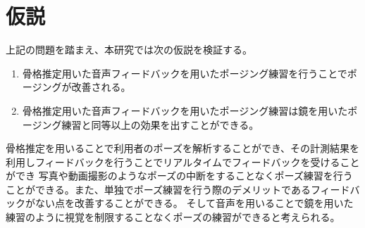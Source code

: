 \section{仮説}
上記の問題を踏まえ、本研究では次の仮説を検証する。
\begin{enumerate}
  \item 骨格推定用いた音声フィードバックを用いたポージング練習を行うことでポージングが改善される。
  \item 骨格推定用いた音声フィードバックを用いたポージング練習は鏡を用いたポージング練習と同等以上の効果を出すことができる。
\end{enumerate}
骨格推定を用いることで利用者のポーズを解析することができ、その計測結果を利用しフィードバックを行うことでリアルタイムでフィードバックを受けることができ
写真や動画撮影のようなポーズの中断をすることなくポーズ練習を行うことができる。また、単独でポーズ練習を行う際のデメリットであるフィードバックがない点を改善することができる。
そして音声を用いることで鏡を用いた練習のように視覚を制限することなくポーズの練習ができると考えられる。
